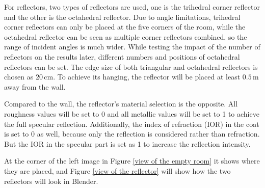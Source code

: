 \documentclass[12pt,DIV14,BCOR12mm,a4paper,footinclude=false,headinclude,parskip=half-,twoside,openright,cleardoublepage=empty,toc=index,bibliography=totoc,listof=totoc]{scrreprt}
\numberwithin{equation}{chapter}
\begin{document}
For reflectors, two types of reflectors are used, one is the trihedral corner reflector and the other is the octahedral reflector. Due to angle limitations, trihedral corner reflectors can only be placed at the five corners of the room, while the octahedral reflector can be seen as multiple corner reflectors combined, so the range of incident angles is much wider. While testing the impact of the number of reflectors on the results later, different numbers and positions of octahedral reflectors can be set. The edge size of both triangular and octahedral reflectors is chosen as $20\,\mathrm{cm}$. To achieve its hanging, the reflector will be placed at least $0.5\,\mathrm{m}$ away from the wall.

Compared to the wall, the reflector's material selection is the opposite. All roughness values will be set to 0 and all metallic values will be set to 1 to achieve the full specular reflection. Additionally, the index of refraction (IOR) in the coat is set to 0 as well, because only the reflection is considered rather than refraction. But the IOR in the specular part is set as 1 to increase the reflection intensity.

At the corner of the left image in Figure \ref{view of the empty room} it shows where they are placed, and Figure \ref{view of the reflector} will show how the two reflectors will look in Blender.
\end{document}
